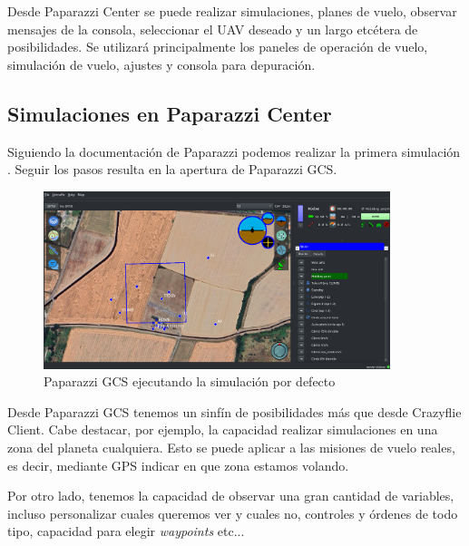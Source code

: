 Desde Paparazzi Center se puede realizar simulaciones, planes de vuelo, observar mensajes de la consola, 
seleccionar el UAV deseado y un largo etcétera de posibilidades.
Se utilizará principalmente los paneles de operación de vuelo, simulación de vuelo, ajustes y consola para depuración.


\subsection{Simulaciones en Paparazzi Center}

Siguiendo la documentación de Paparazzi  podemos realizar la primera simulación \cite{paparazzi_first_simulation}. 
Seguir los pasos resulta en la apertura de Paparazzi GCS.

\begin{figure}[h]
    \centering
    \includegraphics[width=0.9\textwidth]{img/fig/fig2.6-paparazzi-gcs-first-sim.png}
    \caption{Paparazzi GCS ejecutando la simulación por defecto}
    \label{fig:paparazzi-first-simulation}
\end{figure}

Desde Paparazzi GCS tenemos un sinfín de posibilidades más que desde Crazyflie Client. Cabe destacar, por ejemplo,
la capacidad realizar simulaciones en una zona del planeta cualquiera. Esto se puede aplicar a las misiones de 
vuelo reales, es decir, mediante GPS indicar en que zona estamos volando. 

Por otro lado, tenemos la capacidad de observar una gran cantidad de variables, incluso personalizar cuales 
queremos ver y cuales no, controles y órdenes de todo tipo, capacidad para elegir \textit{waypoints} etc...

